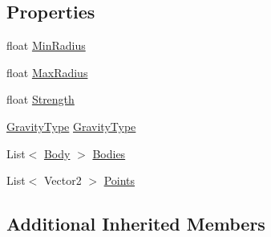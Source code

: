 \subsection*{Properties}
\begin{DoxyCompactItemize}
\item 
float \hyperlink{class_farseer_physics_1_1_controllers_1_1_gravity_controller_a62164441fdaa380f2fd9e265a9ba9fd7}{Min\+Radius}
\item 
float \hyperlink{class_farseer_physics_1_1_controllers_1_1_gravity_controller_a32eb34c2a5dbdd9e6a1ea439a52e08c3}{Max\+Radius}
\item 
float \hyperlink{class_farseer_physics_1_1_controllers_1_1_gravity_controller_a3aa01b0a64edcc24946b621b71f9a6e2}{Strength}
\item 
\hyperlink{namespace_farseer_physics_1_1_controllers_a0780c40c19c557616e5ce1d531d1a78c}{Gravity\+Type} \hyperlink{class_farseer_physics_1_1_controllers_1_1_gravity_controller_a77c6878823a58581aa7941eee7f29637}{Gravity\+Type}
\item 
List$<$ \hyperlink{class_farseer_physics_1_1_dynamics_1_1_body}{Body} $>$ \hyperlink{class_farseer_physics_1_1_controllers_1_1_gravity_controller_a4a4005415b405906f9e5cd9cec1d3f85}{Bodies}
\item 
List$<$ Vector2 $>$ \hyperlink{class_farseer_physics_1_1_controllers_1_1_gravity_controller_a9b05fca86103e44d8da49ab878a8d34a}{Points}
\end{DoxyCompactItemize}
\subsection*{Additional Inherited Members}


